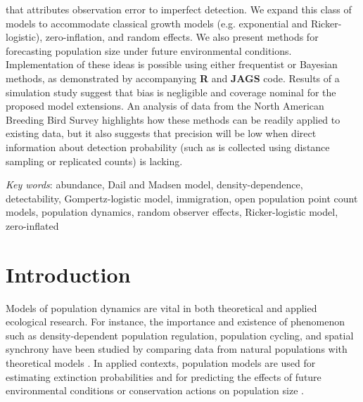 \documentclass[12pt,english]{article}
\begin{document}
\begin{spacing}{1.9}
\begin{flushleft}
{\citet[Biometrics]{dail_madsen:2011} 
that attributes observation error to imperfect detection.
We expand this class of models to accommodate classical growth
models (e.g. exponential and Ricker-logistic), zero-inflation,
and random effects. 
We also present methods for forecasting
population size under future environmental conditions. Implementation
of these ideas is possible using either frequentist or Bayesian
methods, as demonstrated by accompanying {\bf R} and {\bf JAGS} code. %
Results of a simulation study suggest that bias is %
negligible and coverage
nominal for the proposed model extensions. An analysis of data from
the North American Breeding Bird Survey highlights how these methods
can be readily applied to existing data, but it also suggests 
that precision will be low when direct information about detection
probability (such as is collected using distance sampling or
replicated counts) is lacking.
}


\textit{Key words}: abundance, Dail and Madsen model, density-dependence,
detectability, Gompertz-logistic model, immigration, open population point 
count models, population dynamics, random observer effects, Ricker-logistic model, zero-inflated

\vspace{0.5cm}

\section*{Introduction}
Models of population dynamics are vital in both theoretical and
applied ecological research. For instance, %
the importance and existence of phenomenon such as
density-dependent population regulation, population cycling, and
spatial synchrony have been studied by comparing data from natural
populations with theoretical models
\citep{may:1975,turchin:1990,bjornstad_etal:1999,royama:1977}. %
In applied contexts, population models are used for estimating extinction probabilities
\citep{schoener_spiller:1992,nadeem_lele:2011,hostetler_etal:2012} and for predicting the
effects of future environmental conditions or conservation actions on
population size \citep{jamieson_brooks:2004,hatfield_etal:2012}.


\end{flushleft}
\end{spacing}
\end{document}
